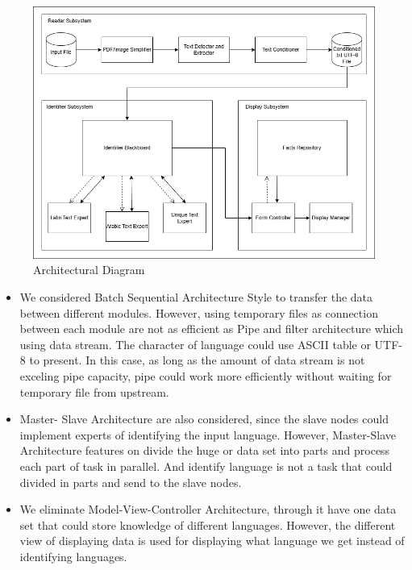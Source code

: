 \begin{figure}[H]
	\centering
	\includegraphics[width=\linewidth]{Section3/architectural_diagramV2.png}
	\caption{Architectural Diagram}
	\label{Architectural    Diagram}
\end{figure}

\begin{itemize}
    \item We considered Batch Sequential Architecture Style to transfer the data between different modules. However, using temporary files as connection between each module are not as efficient as Pipe and filter architecture which using data stream. The character of language could use ASCII table or UTF-8 to present. In this case, as long as the amount of data stream is not exceling pipe capacity, pipe could work more efficiently without waiting for temporary file from upstream.
    \item Master- Slave Architecture are also considered, since the slave nodes could implement experts of identifying the input language. However, Master-Slave Architecture features on divide the huge or data set into parts and process each part of task in parallel. And identify language is not a task that could divided in parts and send to the slave nodes. 
    \item We eliminate Model-View-Controller Architecture, through it have one data set that could store knowledge of different languages. However, the different view of displaying data is used for displaying what language we get instead of identifying languages. 
\end{itemize}

